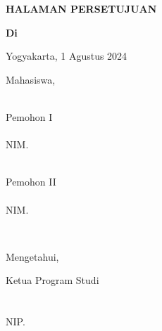 \newpage
\begin{center}
    \begin{doublespace}
        \textbf{\large \MakeUppercase{HALAMAN PERSETUJUAN\\ \tipe}}
    \end{doublespace}
\end{center}

\begin{center}
	\textbf{{\normalsize Di \perusahaan}} \\[2cm]
\end{center}

\begin{center}
    Yogyakarta, 1 Agustus 2024
\end{center}

\begin{center}
    Mahasiswa,
\end{center}
 \begin{minipage}{0.48\textwidth}
    \hfill\\[0.25cm]
    Pemohon I \\[2cm]
    \underline{\penulisPertama}\\
    NIM. \nimPertama
\end{minipage}
\hfill
\begin{minipage}{0.45\textwidth}
    \hfill\\[0.25cm]
    Pemohon II\\[2cm]
    \underline{\penulisKedua}\\
    NIM. \nimKedua
\end{minipage}%
\\[1cm]

\begin{center}
    Mengetahui, \\[1cm]
    \begin{minipage}{0.45\textwidth}
    \begin{center}
        Ketua Program Studi\\
        {\prodi}\\[2cm]
        \underline{\koorprodi}\\
        NIP. \NIPkoorprodi
    \end{center}
    \end{minipage}%
\end{center}
